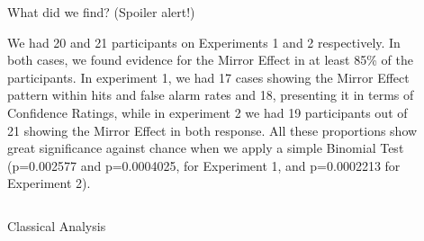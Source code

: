 \documentclass[final]{beamer}
\newlength{\sepwid}
\newlength{\onecolwid}
\newlength{\twocolwid}
\begin{document}
\begin{frame}[t]
\begin{columns}[t]
\begin{column}{\onecolwid}

\end{column} %

\begin{column}{\sepwid}\end{column} %

\begin{column}{\twocolwid} %



\begin{alertblock}{What did we find? (Spoiler alert!)}

We had 20 and 21 participants on Experiments 1 and 2 respectively. In both cases, we found evidence for the Mirror Effect in at least 85\% of the participants. In experiment 1, we had 17 cases showing the Mirror Effect pattern within hits and false alarm rates and 18, presenting it in terms of Confidence Ratings, while in experiment 2 we had 19 participants out of 21 showing the Mirror Effect in both response. All these proportions show great significance against chance when we apply a simple Binomial Test (p=0.002577 and p=0.0004025, for Experiment 1, and p=0.0002213 for Experiment 2).

\end{alertblock} 

\begin{columns}[t,totalwidth=\twocolwid] %
\begin{column}{\onecolwid}\vspace{-.6in} %

\begin{alertblock}{Classical Analysis}


\end{alertblock}
\end{column}
\end{columns}
\end{column}
\end{columns}
\end{frame}
\end{document}
